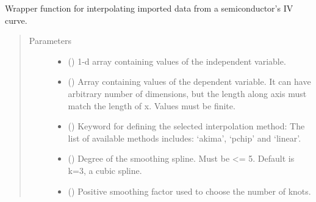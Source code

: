 \documentclass[letterpaper,10pt,english,openany, oneside]{sphinxmanual}
\begin{document}
\begin{fulllineitems}
\label{\detokenize{index:fompy.fom.interpol}}
Wrapper function for interpolating imported data from a semiconductor’s IV curve.
\begin{quote}\begin{description}
\item[{Parameters}] \leavevmode\begin{itemize}
\item {} 
 (\sphinxstyleliteralemphasis{\sphinxupquote{, }}\sphinxstyleliteralemphasis{\sphinxupquote{ (}}\sphinxstyleliteralemphasis{\sphinxupquote{,}}\sphinxstyleliteralemphasis{\sphinxupquote{)}}) \textendash{} 1-d array containing values of the independent variable.

\item {} 
 () \textendash{} Array containing values of the dependent variable.
It can have arbitrary number of dimensions, but the length along axis
must match the length of x. Values must be finite.

\item {} 
 () \textendash{} Keyword for defining the selected interpolation method: The list of available methods includes:
‘akima’, ‘pchip’ and ‘linear’.

\item {} 
 () \textendash{} Degree of the smoothing spline. Must be \textless{}= 5.
Default is k=3, a cubic spline.

\item {} 
 () \textendash{} Positive smoothing factor used to choose the number of knots.

\end{itemize}

\end{description}\end{quote}

\end{fulllineitems}
\end{document}
